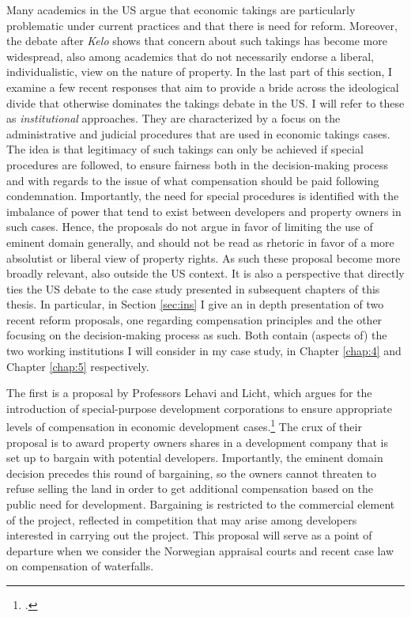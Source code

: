 {Many academics in the US argue that economic takings are particularly problematic under current practices and that there is need for reform. Moreover, the debate after {\it Kelo} shows that concern about such takings has become more widespread, also among academics that do not necessarily endorse a liberal, individualistic, view on the nature of property. In the last part of this section, I examine a few recent responses that aim to provide a bride across the ideological divide that otherwise dominates the takings debate in the US. I will refer to these as {\it institutional} approaches. They are characterized by a focus on the administrative and judicial procedures that are used in economic takings cases. The idea is that legitimacy of such takings can only be achieved if special procedures are followed, to ensure fairness both in the decision-making process and with regards to the issue of what compensation should be paid following condemnation. Importantly, the need for special procedures is identified with the imbalance of power that tend to exist between developers and property owners in such cases. Hence, the proposals do not argue in favor of limiting the use of eminent domain generally, and should not be read as rhetoric in favor of a more absolutist or liberal view of property rights. As such these proposal become more broadly relevant, also outside the US context. It is also a perspective that directly ties the US debate to the case study presented in subsequent chapters of this thesis. In particular, in Section \ref{sec:ins} I give an in depth presentation of two recent reform proposals, one regarding compensation principles and the other focusing on the decision-making process as such. Both contain (aspects of) the two working institutions I will consider in my case study, in Chapter \ref{chap:4} and Chapter \ref{chap:5} respectively.


The first is a proposal by Professors Lehavi and Licht, which argues for the introduction of special-purpose development corporations to ensure appropriate levels of compensation in economic development cases.\footcite{lehavi07} The crux of their proposal is to award property owners shares in a development company that is set up to bargain with potential developers. Importantly, the eminent domain decision precedes this round of bargaining, so the owners cannot threaten to refuse selling the land in order to get additional compensation based on the public need for development. Bargaining is restricted to the commercial element of the project, reflected in competition that may arise among developers interested in carrying out the project. This proposal will serve as a point of departure when we consider the Norwegian appraisal courts and recent case law on compensation of waterfalls.

}
